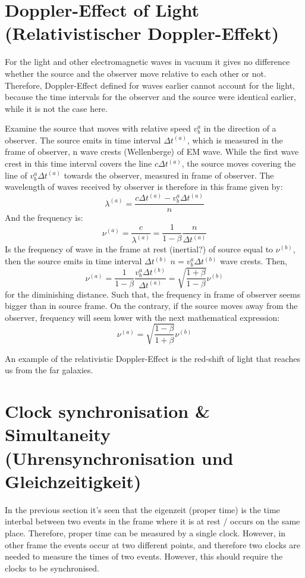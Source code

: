 \documentclass{report}
\begin{document}
\section{Doppler-Effect of Light (Relativistischer Doppler-Effekt)}
For the light and other electromagnetic waves in vacuum it gives no difference whether the source and the observer move relative to each other or not. Therefore, Doppler-Effect defined for waves earlier cannot account for the light, because the time intervals for the observer and the source were identical earlier, while it is not the case here.

Examine the source that moves with relative speed $v_b^a$ in the direction of a observer. The source emits in time interval $\Delta t^{(a)}$, which is measured in the frame of observer, n wave crests (Wellenberge) of EM wave. While the first wave crest in this time interval covers the line $c\Delta t^{(a)}$, the source moves covering the line of $v_b^a \Delta t^{(a)}$ towards the observer, measured in frame of observer. The wavelength of waves received by observer is therefore in this frame given by:
\[ \lambda^{(a)} = \frac{c\Delta t^{(a)} - v_b^a \Delta t^{(a)} }{n}\]
And the frequency is:
\[ \nu^{(a)} = \frac{c}{\lambda^{(a)}} = \frac{1}{1-\beta} \frac{n}{\Delta t^{(a)}}\]
Is the frequency of wave in the frame at rest (inertial?) of source equal to $\nu^{(b)}$, then the source emits in time interval $\Delta t^{(b)}$ \( n = v_b^a \Delta t^{(b)}\) wave crests. Then,
\begin{equation}
    \nu^{(a)} =  \frac{1}{1-\beta} \frac{v_b^a \Delta t^{(b)}}{\Delta t^{(a)}} = \sqrt{\frac{1+\beta}{1-\beta}}\nu^{(b)}
\end{equation}
for the diminishing distance. Such that, the frequency in frame of observer seems bigger than in source frame. On the contrary, if the source moves away from the observer, frequency will seem lower with the next mathematical expression:
\begin{equation}
    \nu^{(a)} = \sqrt{\frac{1-\beta}{1+\beta}}\nu^{(b)}
\end{equation}

An example of the relativistic Doppler-Effect is the red-shift of light that reaches us from the far galaxies.
\section{Clock synchronisation \& Simultaneity (Uhrensynchronisation und Gleichzeitigkeit)}

In the previous section it's seen that the eigenzeit (proper time) is the time interbal between two events in the frame where it is at rest / occurs on the same place. Therefore, proper time can be measured by a single clock. However, in other frame the events occur at two different points, and therefore two clocks are needed to measure the times of two events. However, this should require the clocks to be synchronised.
\end{document}
